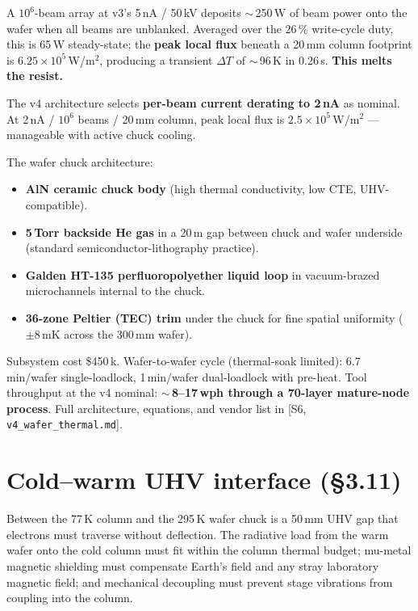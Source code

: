 \documentclass[11pt,letterpaper]{article}
\begin{document}
A $10^6$-beam array at v3's 5\,nA / 50\,kV deposits $\sim$\,250\,W of beam power onto the wafer when all beams are unblanked. Averaged over the 26\,\% write-cycle duty, this is 65\,W steady-state; the \textbf{peak local flux} beneath a 20\,mm column footprint is $6.25 \times 10^5$\,W/m$^2$, producing a transient $\Delta T$ of $\sim$\,96\,K in 0.26\,s. \textbf{This melts the resist.}

The v4 architecture selects \textbf{per-beam current derating to 2\,nA} as nominal. At 2\,nA / $10^6$ beams / 20\,mm column, peak local flux is $2.5 \times 10^5$\,W/m$^2$ --- manageable with active chuck cooling.

The wafer chuck architecture:

\begin{itemize}[leftmargin=1.6em]
  \item \textbf{AlN ceramic chuck body} (high thermal conductivity, low CTE, UHV-compatible).
  \item \textbf{5\,Torr backside He gas} in a 20\,\textmu m gap between chuck and wafer underside (standard semiconductor-lithography practice).
  \item \textbf{Galden HT-135 perfluoropolyether liquid loop} in vacuum-brazed microchannels internal to the chuck.
  \item \textbf{36-zone Peltier (TEC) trim} under the chuck for fine spatial uniformity ($\pm 8$\,mK across the 300\,mm wafer).
\end{itemize}

Subsystem cost \$450\,k. Wafer-to-wafer cycle (thermal-soak limited): 6.7\,min/wafer single-loadlock, 1\,min/wafer dual-loadlock with pre-heat. Tool throughput at the v4 nominal: \textbf{$\sim$\,8--17\,wph through a 70-layer mature-node process}. Full architecture, equations, and vendor list in [S6, \texttt{v4\_wafer\_thermal.md}].

\section{Cold--warm UHV interface (\S 3.11)}

Between the 77\,K column and the 295\,K wafer chuck is a 50\,mm UHV gap that electrons must traverse without deflection. The radiative load from the warm wafer onto the cold column must fit within the column thermal budget; mu-metal magnetic shielding must compensate Earth's field and any stray laboratory magnetic field; and mechanical decoupling must prevent stage vibrations from coupling into the column.
\end{document}
